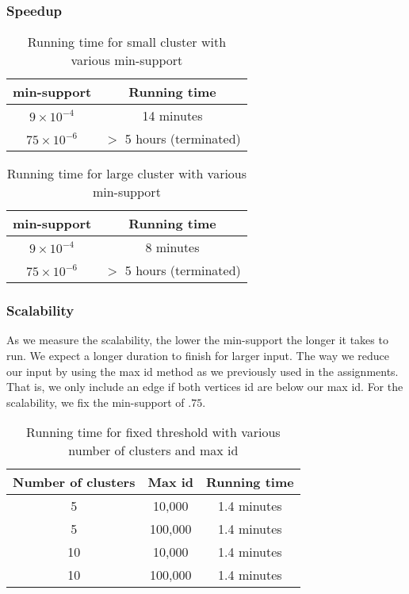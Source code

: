 \documentclass[11pt]{article}
\begin{document}
\subsubsection{Speedup}


\begin{table}[h!]
    \centering
    \begin{tabular}{||c c||}
        \hline
        min-support & Running time \\
        \hline\hline
        $9 \times 10^{-4}$ & 14 minutes \\
        $75 \times 10^{-6}$ & $>$ 5 hours (terminated) \\
        \hline
    \end{tabular}
    \caption{Running time for small cluster with various min-support}
    \label{table:2}
\end{table}

\begin{table}[h!]
    \centering
    \begin{tabular}{||c c||}
        \hline
        min-support & Running time \\
        \hline\hline
        $9 \times 10^{-4}$ & 8 minutes \\
        $75 \times 10^{-6}$ & $>$ 5 hours (terminated) \\
        \hline
    \end{tabular}
    \caption{Running time for large cluster with various min-support}
    \label{table:3}
\end{table}

\subsubsection{Scalability}

As we measure the scalability, the lower the min-support the longer it takes to run.
We expect a longer duration to finish for larger input.
The way we reduce our input by using the max id method as we previously used in the assignments.
That is, we only include an edge if both vertices id are below our max id.
For the scalability, we fix the min-support of $.75$.

\begin{table}[h!]
    \centering
    \begin{tabular}{||c c c||}
        \hline
        Number of clusters & Max id & Running time \\
        \hline\hline
        5 & 10,000 & 1.4 minutes \\
        5 & 100,000 & 1.4 minutes \\
        \hline
        10 & 10,000 & 1.4 minutes \\
        10 & 100,000 & 1.4 minutes \\
        \hline
    \end{tabular}
    \caption{Running time for fixed threshold with various number of clusters and max id}
    \label{table:4}
\end{table}
\end{document}
